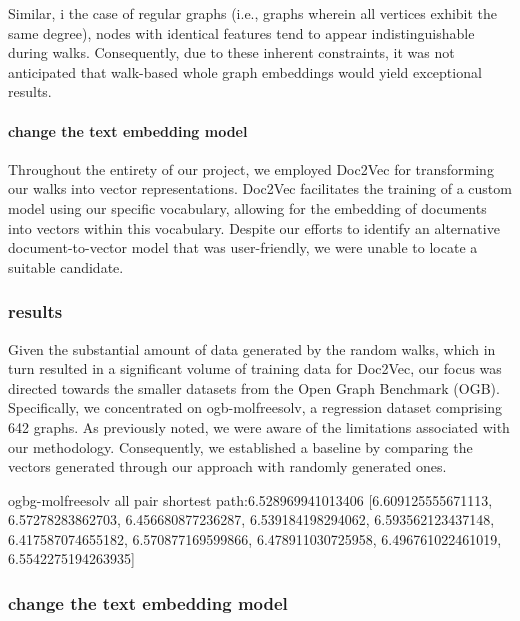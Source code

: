 Similar, i the case of regular graphs (i.e., graphs wherein all vertices exhibit the same degree), nodes with identical features tend to appear indistinguishable during walks. Consequently, due to these inherent constraints, it was not anticipated that walk-based whole graph embeddings would yield exceptional results.

\paragraph{change the text embedding model}
Throughout the entirety of our project, we employed Doc2Vec\cite{2014doc2vec} for transforming our walks into vector representations. Doc2Vec facilitates the training of a custom model using our specific vocabulary, allowing for the embedding of documents into vectors within this vocabulary. Despite our efforts to identify an alternative document-to-vector model that was user-friendly, we were unable to locate a suitable candidate.

\subsubsection{results}
Given the substantial amount of data generated by the random walks, which in turn resulted in a significant volume of training data for Doc2Vec, our focus was directed towards the smaller datasets from the Open Graph Benchmark (OGB). Specifically, we concentrated on ogb-molfreesolv, a regression dataset comprising 642 graphs. As previously noted, we were aware of the limitations associated with our methodology. Consequently, we established a baseline by comparing the vectors generated through our approach with randomly generated ones.

ogbg-molfreesolv
all pair shortest path:6.528969941013406
[6.609125555671113, 6.57278283862703, 6.456680877236287, 6.539184198294062, 6.593562123437148, 6.417587074655182, 6.570877169599866, 6.478911030725958, 6.496761022461019, 6.5542275194263935]

\subsubsection{change the text embedding model}